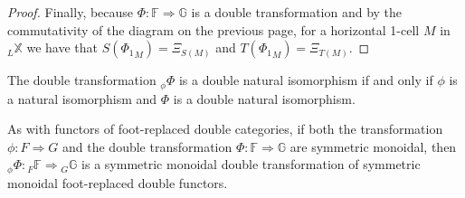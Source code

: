 \documentclass[oneside,final]{ucr}
\theoremstyle{definition}
\newcommand{\maps}{\colon}
\newcommand{\lX}{\mathbb{X}}
\begin{document}
{\begin{proof}
Finally, because $\Phi \maps \mathbb{F} \Rightarrow \mathbb{G}$ is a double transformation and by the commutativity of the diagram on the previous page, for a horizontal 1-cell $M$ in $_L \lX$ we have that $S({\Phi_1}_{M})=\Xi_{S(M)}$ and $T({\Phi_1}_{M}) = \Xi_{T(M)}$.
\end{proof}

The double transformation ${ _\phi \Phi}$ is a double natural isomorphism if and only if $\phi$ is a natural isomorphism and $\Phi$ is a double natural isomorphism.

As with functors of foot-replaced double categories, if both the transformation $\phi \maps F \Rightarrow G$ and the double transformation $\Phi \maps \mathbb{F} \Rightarrow \mathbb{G}$ are symmetric monoidal, then ${ _\phi \Phi } \maps { _F \mathbb{F} } \Rightarrow { _G \mathbb{G} }$ is a symmetric monoidal double transformation of symmetric monoidal foot-replaced double functors. 

}
\end{document}
